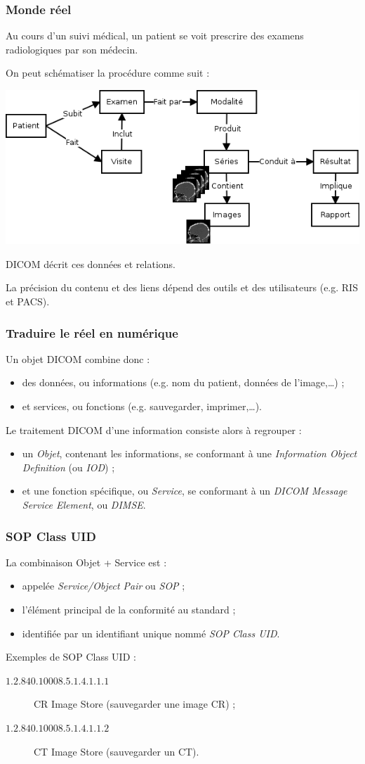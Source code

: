 	\frame
	{
		\frametitle{Monde r\'eel}
		Au cours d'un suivi m\'edical, un patient se voit prescrire des examens radiologiques par son m\'edecin.
		
		On peut sch\'ematiser la proc\'edure comme suit :
		
		\includegraphics[width=\linewidth]{./figures/scenario.png}
		
		DICOM d\'ecrit ces donn\'ees et relations.
		
		La pr\'ecision du contenu et des liens d\'epend des outils et des utilisateurs (e.g. RIS et PACS).
	}

	\frame
	{
		\frametitle{Traduire le r\'eel en num\'erique}
		
		Un objet DICOM combine donc :
		\begin{itemize}
			\item des donn\'ees, ou informations (e.g. nom du patient, donn\'ees de l'image,\ldots) ;
			\item et services, ou fonctions (e.g. sauvegarder, imprimer,\ldots).
		\end{itemize}
		
		Le traitement DICOM d'une information consiste alors \`a regrouper :
		\begin{itemize}
			\item un \emph{Objet}, contenant les informations, se conformant \`a une \emph{Information Object Definition} (ou \emph{IOD}) ;
			\item et une fonction sp\'ecifique, ou \emph{Service}, se conformant \`a un \emph{DICOM Message Service Element}, ou \emph{DIMSE}.
		\end{itemize}
	}
	
	\frame
	{
		\frametitle{SOP Class UID}		

		La combinaison Objet + Service est :
		\begin{itemize}
			\item appel\'ee \emph{Service/Object Pair} ou \emph{SOP} ;
			\item l'\'el\'ement principal de la conformit\'e au standard ;
			\item identifi\'ee par un identifiant unique nomm\'e \emph{SOP Class UID}.
		\end{itemize}
		
		Exemples de SOP Class UID :
		\begin{description}
			\item[$1.2.840.10008.5.1.4.1.1.1$] CR Image Store (sauvegarder  une image CR) ;
			\item[$1.2.840.10008.5.1.4.1.1.2$] CT Image Store (sauvegarder  un CT).
		\end{description}
	}
	
